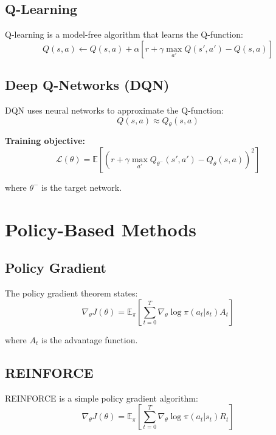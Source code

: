 \subsection{Q-Learning}

Q-learning is a model-free algorithm that learns the Q-function:
\begin{equation}
    Q(s,a) \leftarrow Q(s,a) + \alpha[r + \gamma \max_{a'} Q(s',a') - Q(s,a)]
\end{equation}

\subsection{Deep Q-Networks (DQN)}

DQN uses neural networks to approximate the Q-function:
\begin{equation}
    Q(s,a) \approx Q_\theta(s,a)
\end{equation}

\textbf{Training objective:}
\begin{equation}
    \mathcal{L}(\theta) = \mathbb{E}[(r + \gamma \max_{a'} Q_{\theta^-}(s',a') - Q_\theta(s,a))^2]
\end{equation}

where $\theta^-$ is the target network.

\section{Policy-Based Methods}

\subsection{Policy Gradient}

The policy gradient theorem states:
\begin{equation}
    \nabla_\theta J(\theta) = \mathbb{E}_\pi\left[\sum_{t=0}^T \nabla_\theta \log \pi(a_t|s_t) A_t\right]
\end{equation}

where $A_t$ is the advantage function.

\subsection{REINFORCE}

REINFORCE is a simple policy gradient algorithm:
\begin{equation}
    \nabla_\theta J(\theta) = \mathbb{E}_\pi\left[\sum_{t=0}^T \nabla_\theta \log \pi(a_t|s_t) R_t\right]
\end{equation}

